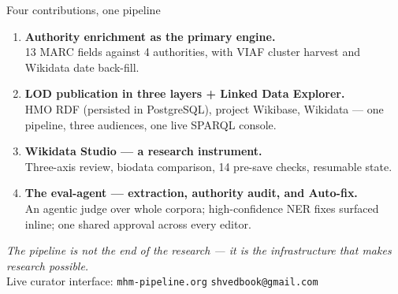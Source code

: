 \documentclass[aspectratio=169,12pt]{beamer}
\begin{document}
\begin{frame}[t]{Four contributions, one pipeline}
  \begin{enumerate}
    \item \textbf{Authority enrichment as the primary engine.}\\
      13 MARC fields against 4 authorities, with VIAF cluster harvest and Wikidata date back-fill.
    \item \textbf{LOD publication in three layers + Linked Data Explorer.}\\
      HMO RDF (persisted in PostgreSQL), project Wikibase, Wikidata --- one pipeline, three audiences, one live SPARQL console.
    \item \textbf{Wikidata Studio --- a research instrument.}\\
      Three-axis review, biodata comparison, 14 pre-save checks, resumable state.
    \item \textbf{The eval-agent --- extraction, authority audit, and Auto-fix.}\\
      An agentic judge over whole corpora; high-confidence NER fixes surfaced inline; one shared approval across every editor.
  \end{enumerate}
  \vfill
  \begin{center}
    \emph{The pipeline is not the end of the research --- it is the infrastructure that makes research possible.}\\[0.4em]
    {\footnotesize Live curator interface: \texttt{mhm-pipeline.org} \quad\textbar\quad \texttt{shvedbook@gmail.com}}
  \end{center}
\end{frame}
\end{document}
